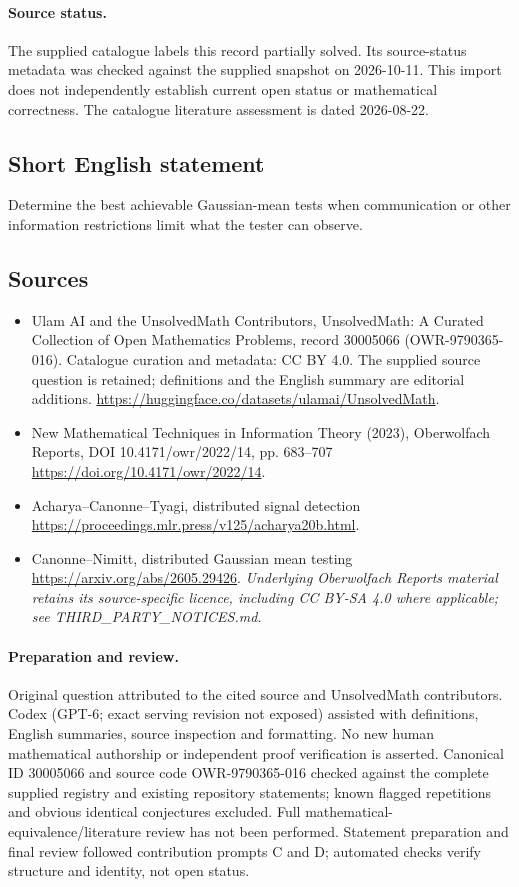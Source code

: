 \documentclass[11pt]{article}
\begin{document}
\paragraph{Source status.}
The supplied catalogue labels this record partially solved. Its source-status metadata was checked against the supplied snapshot on 2026-10-11. This import does not independently establish current open status or mathematical correctness. The catalogue literature assessment is dated 2026-08-22.
\subsection{Short English statement}
Determine the best achievable Gaussian-mean tests when communication or other information restrictions limit what the tester can observe.
\subsection{Sources}
\begin{itemize}
\item[S1] Ulam AI and the UnsolvedMath Contributors, UnsolvedMath: A Curated Collection of Open Mathematics Problems, record 30005066 (OWR-9790365-016). Catalogue curation and metadata: CC BY 4.0. The supplied source question is retained; definitions and the English summary are editorial additions.
\url{https://huggingface.co/datasets/ulamai/UnsolvedMath}.
\item[S2] New Mathematical Techniques in Information Theory (2023), Oberwolfach Reports, DOI 10.4171/owr/2022/14, pp. 683--707
\url{https://doi.org/10.4171/owr/2022/14}.
\item[S3] Acharya--Canonne--Tyagi, distributed signal detection
\url{https://proceedings.mlr.press/v125/acharya20b.html}.
\item[S4] Canonne--Nimitt, distributed Gaussian mean testing
\url{https://arxiv.org/abs/2605.29426}.
\textit{Underlying Oberwolfach Reports material retains its source-specific licence, including CC BY-SA 4.0 where applicable; see THIRD\_PARTY\_NOTICES.md.}
\end{itemize}
\paragraph{Preparation and review.}
Original question attributed to the cited source and UnsolvedMath contributors. Codex (GPT-6; exact serving revision not exposed) assisted with definitions, English summaries, source inspection and formatting. No new human mathematical authorship or independent proof verification is asserted. Canonical ID 30005066 and source code OWR-9790365-016 checked against the complete supplied registry and existing repository statements; known flagged repetitions and obvious identical conjectures excluded. Full mathematical-equivalence/literature review has not been performed. Statement preparation and final review followed contribution prompts C and D; automated checks verify structure and identity, not open status.
\label{end:30005066}
\end{document}

